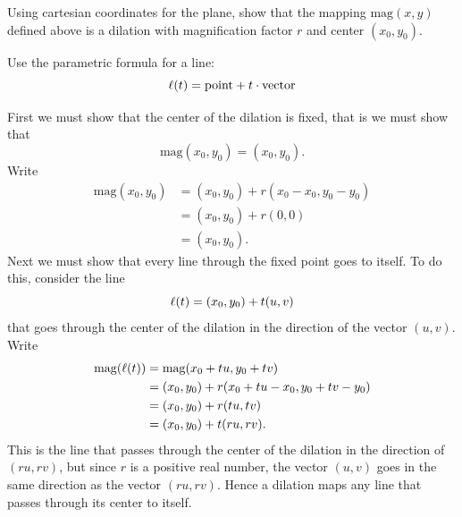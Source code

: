 \documentclass[newpage,hints,handout,12pt,noauthor,nooutcomes]{ximera}
\begin{document}
\begin{problem}
Using cartesian coordinates for the plane, show that the mapping $\mathrm{mag}(x,y)$
defined above is a dilation with magnification factor $r$ and center
$\left( x_{0},y_{0}\right) $.
\begin{hint}
  Use the parametric formula for a line:
  \[
  \ell(t) = \text{point} + t \cdot \text{vector}
  \]
\end{hint}
\begin{freeResponse}
First we must show that the center of the dilation is fixed, that is we must show that 
\[
\mathrm{mag}(x_0,y_0) = (x_0,y_0).
\]
Write
\begin{align*}
\mathrm{mag}(x_0,y_0) &= (x_0,y_0) + r(x_0-x_0,y_0-y_0)\\
&= (x_0,y_0) + r(0,0)\\
&=(x_0,y_0).
\end{align*}
Next we must show that every line through the fixed point goes to
itself. To do this, consider the line
\[
\ell(t) = (x_0,y_0) + t(u,v)
\]
that goes through the center of the dilation in the direction of the
vector $(u,v)$. Write
\begin{align*}
\mathrm{mag}(\ell(t)) &= \mathrm{mag}(x_0+tu,y_0+tv)\\
&= (x_0,y_0) + r(x_0+tu-x_0,y_0+tv-y_0)\\
&= (x_0,y_0) + r(tu,tv)\\
&= (x_0,y_0) + t(ru,rv). 
\end{align*}
This is the line that passes through the center of the dilation in the
direction of $(ru,rv)$, but since $r$ is a positive real number, the
vector $(u,v)$ goes in the same direction as the vector
$(ru,rv)$. Hence a dilation maps any line that passes through its
center to itself.


\end{freeResponse}
\end{problem}
\end{document}

